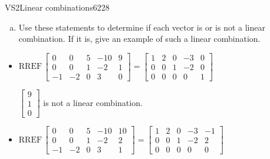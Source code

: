 \begin{exercise}{VS2}{Linear combinations}{6228}
\begin{exerciseStatement}
\begin{enumerate}[(a)]
\begin{itemize}
 
\end{itemize}

     
\item  

 Use these statements to determine if each vector is or is not a linear combination. If it is, give an example of such a linear combination. 

 
\end{enumerate}

     \end{exerciseStatement}
 \begin{exerciseAnswer} 

\begin{itemize}
\item  

 \(
\mathrm{RREF}\, \left[\begin{array}{cccc|c}
0 & 0 & 5 & -10 & 9 \\
0 & 0 & 1 & -2 & 1 \\
-1 & -2 & 0 & 3 & 0
\end{array}\right] = \left[\begin{array}{cccc|c}
1 & 2 & 0 & -3 & 0 \\
0 & 0 & 1 & -2 & 0 \\
0 & 0 & 0 & 0 & 1
\end{array}\right]
                        \) 

 

 \(\left[\begin{array}{c}
9 \\
1 \\
0
\end{array}\right]\) is not a linear combination. 

 
\item  

 \(
\mathrm{RREF}\, \left[\begin{array}{cccc|c}
0 & 0 & 5 & -10 & 10 \\
0 & 0 & 1 & -2 & 2 \\
-1 & -2 & 0 & 3 & 1
\end{array}\right] = \left[\begin{array}{cccc|c}
1 & 2 & 0 & -3 & -1 \\
0 & 0 & 1 & -2 & 2 \\
0 & 0 & 0 & 0 & 0
\end{array}\right]
                        \) 

 


\end{itemize}
\end{exerciseAnswer}
\end{exercise}
